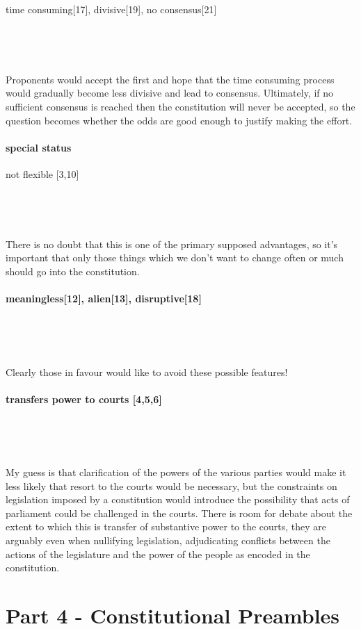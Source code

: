 \documentclass[14pt,titlepage]{extarticle}
\begin{document}
time consuming[17], divisive[19], no consensus[21]

\

\

Proponents would accept the first and hope that the time consuming process would gradually become less divisive and lead to consensus.
Ultimately, if no sufficient consensus is reached then the constitution will never be accepted, so the question becomes whether the odds are good enough to justify making the effort.

\paragraph{special status}

not flexible [3,10]

\ 

\

There is no doubt that this is one of the primary supposed advantages, so it's important that only those things which we don't want to change often or much should go into the constitution.

\paragraph{meaningless[12], alien[13], disruptive[18]}

\

\

Clearly those in favour would like to avoid these possible features!

\paragraph{transfers power to courts [4,5,6]}

\

\ 

My guess is that clarification of the powers of the various parties would make it less likely that resort to the courts would be necessary, but the constraints on legislation imposed by a constitution would introduce the possibility that acts of parliament could be challenged in the courts.
There is room for debate about the extent to which this is transfer of substantive power to the courts, they are arguably even when nullifying legislation, adjudicating conflicts between the actions of the legislature and the power of the people as encoded in the constitution.


\section{Part 4 - Constitutional Preambles}\label{part4}
\end{document}
